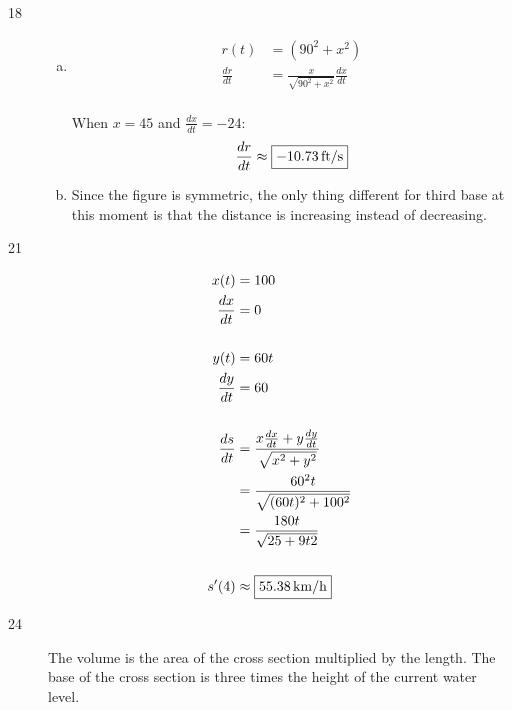 \documentclass[letterpaper, landscape]{exam}
\begin{document}
\begin{description}

    \item[18]
      \begin{enumerate}[(a)]

        \item 
          \begin{align*}
            r(t)          & = \left( 90^2 + x^2 \right) \\
            \frac{dr}{dt} & = \frac{x}{\sqrt{90^2 + x^2}} \frac{dx}{dt} \\
          \end{align*}

          When $x = 45$ and $\frac{dx}{dt} = -24$:
          \[
            \frac{dr}{dt} \approx \boxed{ \unit[-10.73]{ft/s} }
          \]

        \item Since the figure is symmetric, the only thing different for third base at this moment
          is that the distance is increasing instead of decreasing.

      \end{enumerate}

    \item[21]
      \begin{align*}
        x(t)          & = 100 \\
        \frac{dx}{dt} & = 0 \\
        \\
        y(t)          & = 60t \\
        \frac{dy}{dt} & = 60 \\
        \\
        \frac{ds}{dt} & = \frac{x \frac{dx}{dt} + y \frac{dy}{dt}}{\sqrt{x^2 + y^2}} \\
                      & = \frac{60^2 t}{\sqrt{(60t)^2 + 100^2}} \\
                      & = \frac{180 t}{\sqrt{25 + 9t2}} \\
        \\
        s'(4)         & \approx \boxed{ \unit[55.38]{km/h} } \\
      \end{align*}

    \newpage

    \item[24]
      The volume is the area of the cross section multiplied by the length. The base of the cross
      section is three times the height of the current water level.


\end{description}
\end{document}
